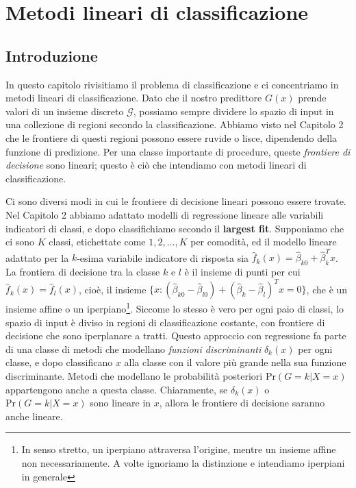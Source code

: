 \documentclass[11pt,openany]{book}
\begin{document}
\tableofcontents

\chapter{Metodi lineari di classificazione}

\section{Introduzione}

In questo capitolo rivisitiamo il problema di classificazione e ci concentriamo in metodi lineari di classificazione. Dato che il nostro predittore $G(x)$ prende valori di un insieme discreto $\mathcal{G}$, possiamo sempre dividere lo spazio di input in una collezione di regioni secondo la classificazione. Abbiamo visto nel Capitolo 2 che le frontiere di questi regioni possono essere ruvide o lisce, dipendendo della funzione di predizione. Per una classe importante di procedure, queste \textit{frontiere di decisione} sono lineari; questo è ciò che intendiamo con metodi lineari di classificazione.

Ci sono diversi modi in cui le frontiere di decisione lineari possono essere trovate. Nel Capitolo 2 abbiamo adattato modelli di regressione lineare alle variabili indicatori di classi, e dopo classifichiamo secondo il \textbf{largest fit}. Supponiamo che ci sono $K$ classi, etichettate come $1, 2, \dots, K$ per comodità, ed il modello lineare adattato per la $k$-esima variabile indicatore di risposta sia $\hat{f}_k(x) = \hat{\beta}_{k0} + \hat{\beta}_k^T x$. La frontiera di decisione tra la classe $k$ e $l$ è il insieme di punti per cui $\hat{f}_k (x) = \hat{f}_l (x)$, cioè, il insieme $\{ x : \left( \hat{\beta}_{k0} - \hat{\beta}_{l0} \right) + \left( \hat{\beta}_{k} - \hat{\beta}_{l} \right)^T x = 0 \}$, che è un insieme affine o un iperpiano\footnote{In senso stretto, un iperpiano attraversa l'origine, mentre un insieme affine non necessariamente. A volte ignoriamo la distinzione e intendiamo iperpiani in generale}. Siccome lo stesso è vero per ogni paio di classi, lo spazio di input è diviso in regioni di classificazione costante, con frontiere di decisione che sono iperplanare a tratti. Questo approccio con regressione fa parte di una classe di metodi che modellano \textit{funzioni discriminanti} $\delta_k (x)$ per ogni classe, e dopo classificano $x$ alla classe con il valore più grande nella sua funzione discriminante. Metodi che modellano le probabilità posteriori $\text{Pr}(G = k | X = x)$ appartengono anche a questa classe. Chiaramente, se $\delta_k (x)$ o $\text{Pr}(G = k | X = x)$ sono lineare in $x$, allora le frontiere di decisione saranno anche lineare.
\end{document}
